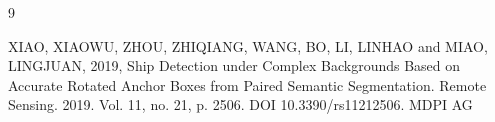 \begin{thebibliography}{9}\small
{}

XIAO, XIAOWU, ZHOU, ZHIQIANG, WANG, BO, LI, LINHAO and MIAO, LINGJUAN, 2019, Ship Detection under Complex Backgrounds Based on Accurate Rotated Anchor Boxes from Paired Semantic Segmentation. Remote Sensing. 2019. Vol. 11, no. 21, p. 2506. DOI 10.3390/rs11212506. MDPI AG

\end{thebibliography}
